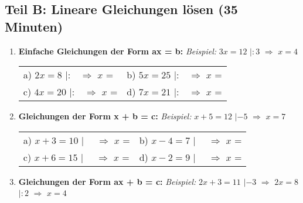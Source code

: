 \subsection*{Teil B: Lineare Gleichungen lösen (35 Minuten)}

\begin{enumerate}[label=\arabic*.]

    \item \textbf{Einfache Gleichungen der Form ax = b:}
    \textit{Beispiel:} $3x = 12$ $|:3$ $\Rightarrow$ $x = 4$
    \vspace{0.5cm}

    \begin{tabular}{ll}
        a) $2x = 8$ $|:\phantom{0}$ $\Rightarrow$ $x$ = \underline{\hspace{2cm}} & b) $5x = 25$ $|:\phantom{0}$ $\Rightarrow$ $x$ = \underline{\hspace{2cm}} \\[3ex]
        c) $4x = 20$ $|:\phantom{0}$ $\Rightarrow$ $x$ = \underline{\hspace{2cm}} & d) $7x = 21$ $|:\phantom{0}$ $\Rightarrow$ $x$ = \underline{\hspace{2cm}}
    \end{tabular}

    \vspace{1cm}

    \item \textbf{Gleichungen der Form x + b = c:}
    \textit{Beispiel:} $x + 5 = 12$ $|-5$ $\Rightarrow$ $x = 7$
    \vspace{0.5cm}

    \begin{tabular}{ll}
        a) $x + 3 = 10$ $|\phantom{00}$ $\Rightarrow$ $x$ = \underline{\hspace{2cm}} & b) $x - 4 = 7$ $|\phantom{00}$ $\Rightarrow$ $x$ = \underline{\hspace{2cm}} \\[3ex]
        c) $x + 6 = 15$ $|\phantom{00}$ $\Rightarrow$ $x$ = \underline{\hspace{2cm}} & d) $x - 2 = 9$ $|\phantom{00}$ $\Rightarrow$ $x$ = \underline{\hspace{2cm}}
    \end{tabular}

    \vspace{1cm}

    \item \textbf{Gleichungen der Form ax + b = c:}
    \textit{Beispiel:} $2x + 3 = 11$ $|-3$ $\Rightarrow$ $2x = 8$ $|:2$ $\Rightarrow$ $x = 4$
    \vspace{0.5cm}


\end{enumerate}
